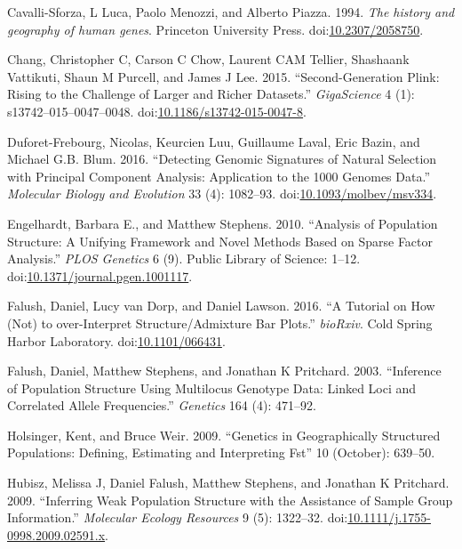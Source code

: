 \documentclass[smallextended]{svjour3}       %
\begin{document}
\hypertarget{ref-CavSforza94}{}
Cavalli-Sforza, L Luca, Paolo Menozzi, and Alberto Piazza. 1994.
\emph{The history and geography of human genes}. Princeton University
Press. doi:\href{https://doi.org/10.2307/2058750}{10.2307/2058750}.

\hypertarget{ref-Chang15}{}
Chang, Christopher C, Carson C Chow, Laurent CAM Tellier, Shashaank
Vattikuti, Shaun M Purcell, and James J Lee. 2015. ``Second-Generation
Plink: Rising to the Challenge of Larger and Richer Datasets.''
\emph{GigaScience} 4 (1): s13742--015--0047--0048.
doi:\href{https://doi.org/10.1186/s13742-015-0047-8}{10.1186/s13742-015-0047-8}.

\hypertarget{ref-Duforet-Frebourg16}{}
Duforet-Frebourg, Nicolas, Keurcien Luu, Guillaume Laval, Eric Bazin,
and Michael G.B. Blum. 2016. ``Detecting Genomic Signatures of Natural
Selection with Principal Component Analysis: Application to the 1000
Genomes Data.'' \emph{Molecular Biology and Evolution} 33 (4): 1082--93.
doi:\href{https://doi.org/10.1093/molbev/msv334}{10.1093/molbev/msv334}.

\hypertarget{ref-Engelhardt10}{}
Engelhardt, Barbara E., and Matthew Stephens. 2010. ``Analysis of
Population Structure: A Unifying Framework and Novel Methods Based on
Sparse Factor Analysis.'' \emph{PLOS Genetics} 6 (9). Public Library of
Science: 1--12.
doi:\href{https://doi.org/10.1371/journal.pgen.1001117}{10.1371/journal.pgen.1001117}.

\hypertarget{ref-Falush16}{}
Falush, Daniel, Lucy van Dorp, and Daniel Lawson. 2016. ``A Tutorial on
How (Not) to over-Interpret Structure/Admixture Bar Plots.''
\emph{bioRxiv}. Cold Spring Harbor Laboratory.
doi:\href{https://doi.org/10.1101/066431}{10.1101/066431}.

\hypertarget{ref-Falush03}{}
Falush, Daniel, Matthew Stephens, and Jonathan K Pritchard. 2003.
``Inference of Population Structure Using Multilocus Genotype Data:
Linked Loci and Correlated Allele Frequencies.'' \emph{Genetics} 164
(4): 471--92.

\hypertarget{ref-Kent09}{}
Holsinger, Kent, and Bruce Weir. 2009. ``Genetics in Geographically
Structured Populations: Defining, Estimating and Interpreting Fst'' 10
(October): 639--50.

\hypertarget{ref-Hubisz09}{}
Hubisz, Melissa J, Daniel Falush, Matthew Stephens, and Jonathan K
Pritchard. 2009. ``Inferring Weak Population Structure with the
Assistance of Sample Group Information.'' \emph{Molecular Ecology
Resources} 9 (5): 1322--32.
doi:\href{https://doi.org/10.1111/j.1755-0998.2009.02591.x}{10.1111/j.1755-0998.2009.02591.x}.
\end{document}
